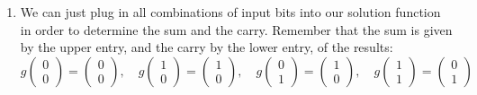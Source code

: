 \begin{enumerate}[label=9.\arabic*]
\begin{gradedsolution}
\begin{enumerate}
\begin{equation}
                = \begin{pmatrix} a \oplus b \\ a \wedge b\end{pmatrix},
                \label{eq:string_of_equations}
            \end{equation}
            which forces the equalities $g_S \begin{pmatrix} a \\ b\end{pmatrix} = a \oplus b$ and $g_C \begin{pmatrix} a \\ b\end{pmatrix} = a \wedge b$.
            This shows uniqueness, and by construction, this is indeed a valid solution function.
            \item {} We can just plug in all combinations of input bits into our solution function in order to determine the sum and the carry. Remember that the sum is given by the upper entry, and the carry by the lower entry, of the results:
            \begin{equation}
                g \begin{pmatrix} 0 \\ 0\end{pmatrix} = \begin{pmatrix} 0 \\ 0\end{pmatrix}, \quad
                g  \begin{pmatrix} 1 \\ 0\end{pmatrix} = \begin{pmatrix} 1 \\ 0\end{pmatrix}, \quad
                g  \begin{pmatrix} 0 \\ 1\end{pmatrix} = \begin{pmatrix} 1 \\ 0\end{pmatrix}, \quad
                g \begin{pmatrix} 1 \\ 1\end{pmatrix} = \begin{pmatrix} 0 \\ 1\end{pmatrix}
                \label{eq:sums_and_carries}
            \end{equation}

\end{enumerate}
\end{gradedsolution}
\end{enumerate}
